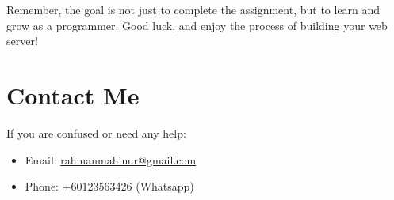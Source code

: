 \documentclass{article}
\begin{document}
Remember, the goal is not just to complete the assignment, but to learn and grow as a programmer. Good luck, and enjoy the process of building your web server!

\section*{Contact Me}
If you are confused or need any help:
\begin{itemize}
    \item Email: \href{mailto:youremail@example.com}{rahmanmahinur@gmail.com}
    \item Phone: +60123563426 (Whatsapp)
\end{itemize}
\end{document}
